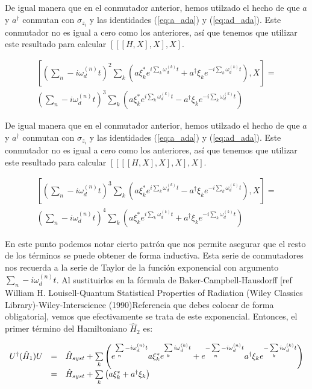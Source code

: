 De igual manera que en el conmutador anterior, hemos utilzado el hecho de que $a$ y $a^\dagger$ conmutan con $\sigma_{z_i}$ y las identidades (\ref{eq:a_ada}) y (\ref{eq:ad_ada}). Este conmutador no es igual a cero como los anteriores, así que tenemos que utilizar este resultado para calcular $[[[H,X],X],X]$.

\begin{multline}
    \left[\left(\sum\limits_n-i \omega_d^{(n)} t\right)^2 \sum\limits_k \left(a\xi_k^*e^{i\sum\limits_k \omega_d^{(k)}t}+ a^\dagger\xi_ke^{-i\sum\limits_k \omega_d^{(k)}t}\right), X\right] = \\
    \left(\sum\limits_n-i \omega_d^{(n)} t\right)^3 \sum\limits_k \left(a\xi_k^*e^{i\sum\limits_k \omega_d^{(k)}t} - a^\dagger\xi_ke^{-i\sum\limits_k \omega_d^{(k)}t}\right)
\end{multline}

De igual manera que en el conmutador anterior, hemos utilzado el hecho de que $a$ y $a^\dagger$ conmutan con $\sigma_{z_i}$ y las identidades (\ref{eq:a_ada}) y (\ref{eq:ad_ada}). Este conmutador no es igual a cero como los anteriores, así que tenemos que utilizar este resultado para calcular $[[[[H,X],X],X],X]$.

\begin{multline}
    \left[\left(\sum\limits_n-i \omega_d^{(n)} t\right)^3 \sum\limits_k \left(a\xi_k^*e^{i\sum\limits_k \omega_d^{(k)}t} - a^\dagger\xi_ke^{-i\sum\limits_k \omega_d^{(k)}t}\right), X\right] = \\
    \left(\sum\limits_n-i \omega_d^{(n)} t\right)^4 \sum\limits_k \left(a\xi_k^*e^{i\sum\limits_k \omega_d^{(k)}t} + a^\dagger\xi_ke^{-i\sum\limits_k \omega_d^{(k)}t}\right)
\end{multline}

En este punto podemos notar cierto patrón que nos permite asegurar que el resto de los términos se puede obtener de forma inductiva. Esta serie de conmutadores nos recuerda a la serie de Taylor de la función exponencial con argumento $\sum\limits_n-i \omega_d^{(n)} t$. Al sustituirlos en la fórmula de Baker-Campbell-Hausdorff [ref William H. Louisell-Quantum Statistical Properties of Radiation (Wiley Classics Library)-Wiley-Interscience (1990)Referencia que debes colocar de forma obligatoria], vemos que efectivamente se trata de este exponencial. Entonces, el primer término del Hamiltoniano $\hat{H}_2$ es:

\begin{equation}
    \begin{array}{r c l}
        U^\dagger (\hat{H}_1) U &=& \hat{H}_{syst} + \sum\limits_k \left(e^{\sum\limits_n-i \omega_d^{(n)} t} a\xi_k^*e^{\sum\limits_k i\omega_d^{(k)}t}+ e^{-\sum\limits_n-i \omega_d^{(n)} t} a^\dagger\xi_ke^{-\sum\limits_k i\omega_d^{(k)}t}\right) \\
                                &=& \hat{H}_{syst} + \sum\limits_k \left(a\xi_k^* + a^\dagger\xi_k\right)
    \end{array}
\end{equation}

